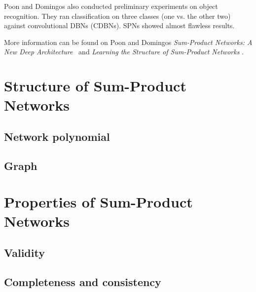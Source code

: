 \documentclass[a4paper,10pt]{article}
\theoremstyle{plain}
\begin{document}
Poon and Domingos also conducted preliminary experiments on object recognition. They ran
classification on three classes (one vs. the other two) against convolutional DBNs (CDBNs). SPNs
showed almost flawless results.

\begin{table}[h]
\end{table}

More information can be found on Poon and Domingos \textit{Sum-Product Networks: A New Deep
Architecture}~\cite{poon-domingos} and \textit{Learning the Structure of Sum-Product Networks}
\cite{gens-domingos}.

\newpage

\section{Structure of Sum-Product Networks}

\subsection{Network polynomial}

\subsection{Graph}

\section{Properties of Sum-Product Networks}

\subsection{Validity}

\subsection{Completeness and consistency}
\end{document}
